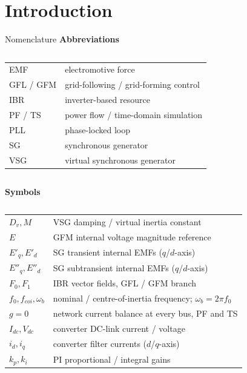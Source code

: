 \documentclass{beamer}
\begin{document}
\section{Introduction}
\begin{frame}{Nomenclature}
\fontsize{6.2}{7.2}\selectfont
\renewcommand{\arraystretch}{1.0}\setlength{\tabcolsep}{3pt}
\textbf{Abbreviations}\par\smallskip
\begin{columns}[t,onlytextwidth]
\begin{tabular}{@{}p{1.55cm}>{\raggedright\arraybackslash}p{3.35cm}@{}}
EMF & electromotive force\\
GFL / GFM & grid-following / grid-forming control\\
IBR & inverter-based resource\\
PF / TS & power flow / time-domain simulation\\
PLL & phase-locked loop\\
SG & synchronous generator\\
VSG & virtual synchronous generator\\
\end{tabular}
\mbox{}
\end{columns}\par\smallskip
\textbf{Symbols}\par\smallskip
\begin{columns}[t,onlytextwidth]
\begin{tabular}{@{}p{1.55cm}>{\raggedright\arraybackslash}p{3.35cm}@{}}
$D_v,M$ & VSG damping / virtual inertia constant\\
$E$ & GFM internal voltage magnitude reference\\
$E'_q,E'_d$ & SG transient internal EMFs ($q$/$d$-axis)\\
$E''_q,E''_d$ & SG subtransient internal EMFs ($q$/$d$-axis)\\
$F_0,F_1$ & IBR vector fields, GFL / GFM branch\\
$f_0,f_{coi},\omega_b$ & nominal / centre-of-inertia frequency; $\omega_b=2\pi f_0$\\
$g=0$ & network current balance at every bus, PF and TS\\
$I_{dc},V_{dc}$ & converter DC-link current / voltage\\
$i_d,i_q$ & converter filter currents ($d$/$q$-axis)\\
$k_p,k_i$ & PI proportional / integral gains\\

\end{tabular}
\end{columns}
\end{frame}
\end{document}
